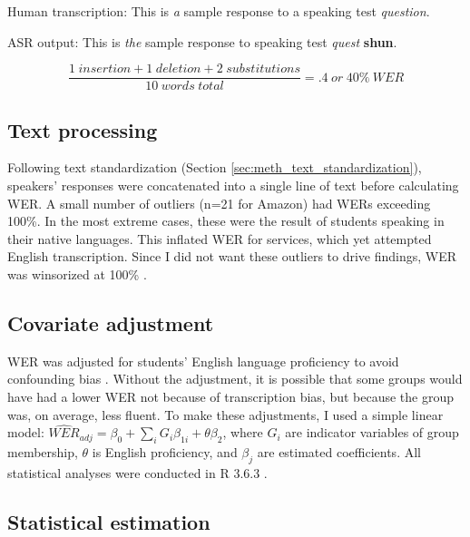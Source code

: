 \documentclass [PhD] {uclathes}
\newlength{\wdth}
\newcommand{\strike}[1]{\settowidth{\wdth}{#1}\rlap{\rule[.5ex]{\wdth}{.4pt}}#1}
\begin{document}
Human transcription: This is \emph{a} sample response to \strike{a} speaking test \emph{question}.

ASR output: This is \emph{the} sample response to speaking test \emph{quest} \textbf{shun}.

$$
\frac{1 \hspace{3pt} insertion + 1 \hspace{3pt} deletion + 2 \hspace{3pt} substitutions}{10 \hspace{3pt} words \hspace{3pt} total} = .4 \hspace{3pt} or \hspace{3pt} 40\% \hspace{3pt} WER
$$

\subsection{Text processing}

Following text standardization (Section \ref{sec:meth_text_standardization}), speakers' responses were concatenated into a single line of text before calculating WER. A small number of outliers (n=21 for Amazon) had WERs exceeding 100\%. In the most extreme cases, these were the result of students speaking in their native languages. This inflated WER for services, which yet attempted English transcription. Since I did not want these outliers to drive findings, WER was winsorized at 100\% \cite{wilcox2012}.

\subsection{Covariate adjustment}
\label{sec:meth_cov}

WER was adjusted for students' English language proficiency to avoid confounding bias \citep{elwert2014}. Without the adjustment, it is possible that some groups would have had a lower WER not because of transcription bias, but because the group was, on average, less fluent. To make these adjustments, I used a simple linear model: ${\widehat{WER}}_{adj} = \beta_0 + {\textstyle\sum}_{i}G_i\beta_{1i} + \theta\beta_2$, where $G_i$ are indicator variables of group membership, $\theta$ is English proficiency, and $\beta_j$ are estimated coefficients. All statistical analyses were conducted in R 3.6.3 \citep{r2020}.

\subsection{Statistical estimation}
\end{document}
